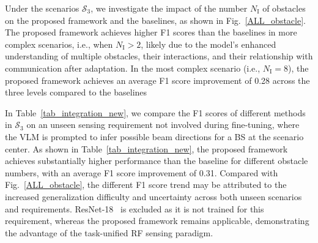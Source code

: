 \documentclass[journal,12pt,onecolumn,draftclsnofoot]{IEEEtran}
\newcommand\SC{\ensuremath{\mathcal{S}}}
\newcommand\IR{\ensuremath{\mathrm{I}}}
\begin{document}
Under the scenarios \( \SC_{3} \), we investigate the impact of the number \( N_{\IR} \) of obstacles on the proposed framework and the baselines, as shown in Fig.~\ref{ALL_obstacle}. The proposed framework achieves higher F1 scores than the baselines in more complex scenarios, i.e., when  \( N_{\IR}>2 \), likely due to the model's enhanced understanding of multiple obstacles, their interactions, and their relationship with communication after adaptation. In the most complex scenario (i.e., \( N_{\IR}=8 \)), the proposed framework achieves an average F1 score improvement of 0.28 across the three levels compared to the baselines


In Table~\ref{tab_integration_new}, we compare the F1 scores of different methods in $\SC_3$ on an unseen sensing requirement not involved during fine-tuning, where the VLM is prompted to infer possible beam directions for a BS at the scenario center. As shown in Table~\ref{tab_integration_new}, the proposed framework achieves substantially higher performance than the baseline for different obstacle numbers, with an average F1 score improvement of 0.31. Compared with Fig.~\ref{ALL_obstacle}, the different F1 score trend may be attributed to the increased generalization difficulty and uncertainty across both unseen scenarios and requirements. ResNet-18~\cite{7780459} is excluded as it is not trained for this requirement, whereas the proposed framework remains applicable, demonstrating the advantage of the task-unified RF sensing paradigm.
\end{document}
